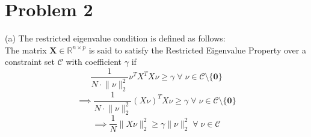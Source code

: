 \documentclass[a4paper,11pt]{article}
\numberwithin{definition}{section}
\numberwithin{mytheorem}{subsection}
\begin{document}
\section{Problem 2}
(a) The restricted eigenvalue condition is defined as follows:\\
The matrix $\boldsymbol{X}\in\mathbb{R}^{n\times p}$ is said to satisfy the Restricted Eigenvalue Property over a constraint set $\mathcal{C}$ with coefficient $\gamma$ if 
$$\frac{1}{N\cdot \lVert\nu\rVert_2^2}\nu^TX^TX\nu \geq \gamma \;\forall\;\nu \in \mathcal{C}\setminus\{\mathbf{0}\}$$
$$\implies \frac{1}{N\cdot \lVert\nu\rVert_2^2}(X\nu)^TX\nu \geq \gamma\;\forall\;\nu \in \mathcal{C}\setminus\{\mathbf{0}\}$$
$$\implies \frac{1}{N}\lVert X\nu\rVert^2_2 \geq \gamma\lVert\nu\rVert_2^2\;\forall\;\nu \in \mathcal{C}$$
\end{document}
